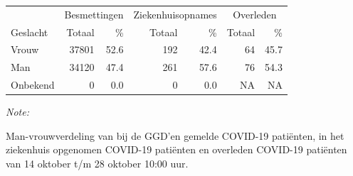 \documentclass[
  english,
  man,floatsintext]{apa6}
\begin{document}
\begin{table}
\centering\begingroup\fontsize{11}{13}\selectfont

\begin{threeparttable}
\begin{tabular}{lrrrrrr}
\toprule
\multicolumn{1}{c}{ } & \multicolumn{2}{c}{Besmettingen} & \multicolumn{2}{c}{Ziekenhuisopnames} & \multicolumn{2}{c}{Overleden} \\
\cmidrule(l{3pt}r{3pt}){2-3} \cmidrule(l{3pt}r{3pt}){4-5} \cmidrule(l{3pt}r{3pt}){6-7}
Geslacht & Totaal & \% & Totaal & \% & Totaal & \%\\
\midrule
Vrouw & 37801 & 52.6 & 192 & 42.4 & 64 & 45.7\\
Man & 34120 & 47.4 & 261 & 57.6 & 76 & 54.3\\
Onbekend & 0 & 0.0 & 0 & 0.0 & NA & NA\\
\bottomrule
\end{tabular}
\begin{tablenotes}
\item \textit{Note: } 
\item Man-vrouwverdeling van bij de GGD’en gemelde COVID-19 patiënten, in het ziekenhuis opgenomen COVID-19 patiënten en overleden COVID-19 patiënten van 14 oktober t/m 28 oktober 10:00 uur.
\end{tablenotes}
\end{threeparttable}
\endgroup{}
\end{table}
\newpage
\end{document}
